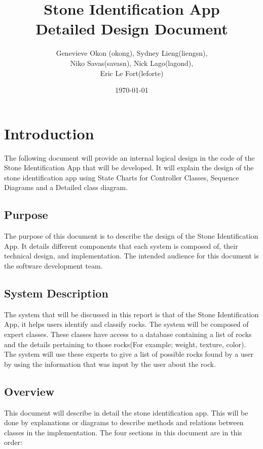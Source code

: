 \documentclass[titlepage]{article}
\title{Stone Identification App \\
	Detailed Design Document}
\author{Genevieve Okon (okong), Sydney Lieng(liengsn),\\
	Niko Savas(savasn), Nick Lago(lagond),\\
	Eric Le Fort(leforte)}
\date{\today}
\begin{document}
\maketitle
\newpage
\tableofcontents
\newpage



\section{Introduction}

The following document will provide an internal logical design in the code of the Stone Identification App that will be developed.  It will explain the design of the stone identification app using State Charts for Controller Classes, Sequence Diagrams and a Detailed class diagram.

\subsection{Purpose}
The purpose of this document is to describe the design of the Stone Identification App. It details different components that each system is composed of, their technical design, and implementation. The intended audience for this document is the software development team.

\subsection{System Description}
The system that will be discussed in this report is that of the Stone Identification App, it helps users identify and classify rocks. The system will be composed of expert classes. These classes have access to a database containing a list of rocks and the details pertaining to those rocks(For example; weight, texture, color). The system will use these experts to give a list of possible rocks found by a user by using the information that was input by the user about the rock. 

\subsection{Overview}
This document will describe in detail the stone identification app. This will be done by explanations or diagrams to describe methods and relations between classes in the implementation. The four sections in this document are in this order: 
\end{document}
